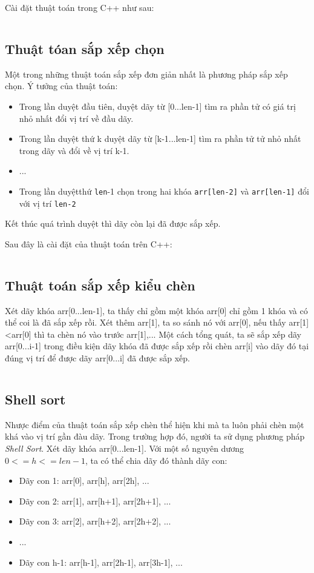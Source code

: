\documentclass[8pt, a4paper]{article}
\newcommand{\mnt}[1]{\inputminted[frame=single, linenos=true, tabsize=4]{c++}{#1}}
\begin{document}
Cài đặt thuật toán trong C++ như sau:
\mnt{src/bublesort.cpp}

\subsection{Thuật tóan sắp xếp chọn}

Một trong những thuật toán sắp xếp đơn giản nhất là phương pháp sắp xếp chọn. Ý tưởng của thuật toán:
\begin{itemize}
\item Trong lần duyệt đầu tiên, duyệt dãy từ [0...len-1] tìm ra phần tử có giá trị nhỏ nhất đổi vị trí về đầu dãy.
\item Trong lần duyệt thứ k duyệt dãy từ [k-1...len-1] tìm ra phần tử tử nhỏ nhất trong dãy và đổi về vị trí k-1.
\item ...
\item Trong lần duyệtthứ \texttt{len}-1 chọn trong hai khóa \texttt{arr[len-2]} và \texttt{arr[len-1]} đổi với vị trí \texttt{len-2}
\end{itemize}

Kết thúc quá trình duyệt thì dãy còn lại đã được sắp xếp.

Sau đây là cài đặt của thuật toán trên C++:
\mnt{src/selectionsort.cpp}

\subsection{Thuật toán sắp xếp kiểu chèn}

Xét dãy khóa arr[0...len-1], ta thấy chỉ gồm một khóa arr[0] chỉ gồm 1 khóa và có thể coi là đã sắp xếp rồi. Xét thêm arr[1], ta so sánh nó với arr[0], nếu thấy arr[1]<arr[0] thì ta chèn nó vào trước arr[1],... Một cách tổng quát, ta sẽ sắp xếp dãy arr[0...i-1] trong điều kiện dãy khóa đã được sắp xếp rồi chèn arr[i] vào dãy đó tại đúng vị trí để được dãy arr[0...i] đã được sắp xếp.

\mnt{src/insertionsort.cpp}

\subsection{Shell sort}

Nhược điểm của thuật toán sắp xếp chèn thể hiện khi mà ta luôn phải chèn một khá vào vị trí gần đàu dãy. Trong trường hợp đó, người ta sử dụng phương pháp \emph{Shell Sort}. Xét dãy khóa arr[0...len-1]. Với một số nguyên dương $0 <= h <= len-1$, ta có thể chia dãy đó thành dãy con:
\begin{itemize}
\item Dãy con 1: arr[0], arr[h], arr[2h], ...
\item Dãy con 2: arr[1], arr[h+1], arr[2h+1], ...
\item Dãy con 3: arr[2], arr[h+2], arr[2h+2], ...
\item ...
\item Dãy con h-1: arr[h-1], arr[2h-1], arr[3h-1], ...
\end{itemize}
\end{document}
